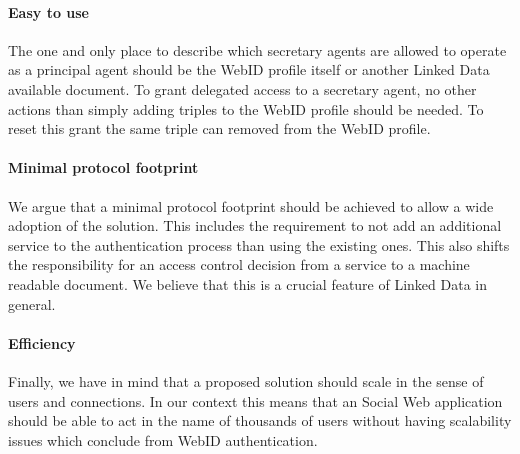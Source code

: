 \documentclass[a4paper]{llncs}
\begin{document}
\paragraph{Easy to use}
The one and only place to describe which secretary agents are allowed to operate as a principal agent should be the WebID profile itself or another Linked Data available document.
To grant delegated access to a secretary agent, no other actions than simply adding triples to the WebID profile should be needed.
To reset this grant the same triple can removed from the WebID profile.


\paragraph{Minimal protocol footprint}
We argue that a minimal protocol footprint should be achieved to allow a wide adoption of the solution.
This includes the requirement to not add an additional service to the authentication process than using the existing ones.
This also shifts the responsibility for an access control decision from a service to a machine readable document.
We believe that this is a crucial feature of Linked Data in general.

\paragraph{Efficiency}
Finally, we have in mind that a proposed solution should scale in the sense of users and connections.
In our context this means that an Social Web application should be able to act in the name of thousands of users without having scalability issues which conclude from WebID authentication. 

 
\end{document}
